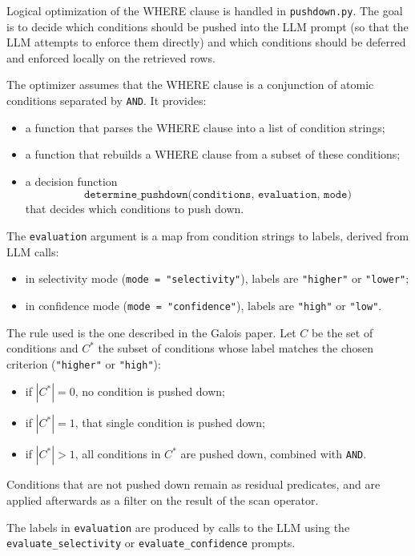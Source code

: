 \documentclass[11pt]{article}
\begin{document}
Logical optimization of the WHERE clause is handled in \texttt{pushdown.py}. The goal is to decide which conditions should be pushed into the LLM prompt (so that the LLM attempts to enforce them directly) and which conditions should be deferred and enforced locally on the retrieved rows.

The optimizer assumes that the WHERE clause is a conjunction of atomic conditions separated by \texttt{AND}. It provides:

\begin{itemize}
  \item a function that parses the WHERE clause into a list of condition strings;
  \item a function that rebuilds a WHERE clause from a subset of these conditions;
  \item a decision function
  \[
    \texttt{determine\_pushdown(conditions, evaluation, mode)}
  \]
  that decides which conditions to push down.
\end{itemize}

The \texttt{evaluation} argument is a map from condition strings to labels, derived from LLM calls:

\begin{itemize}
  \item in selectivity mode (\texttt{mode = "selectivity"}), labels are \texttt{"higher"} or \texttt{"lower"};
  \item in confidence mode (\texttt{mode = "confidence"}), labels are \texttt{"high"} or \texttt{"low"}.
\end{itemize}

The rule used is the one described in the Galois paper. Let $C$ be the set of conditions and $C^\ast$ the subset of conditions whose label matches the chosen criterion (\texttt{"higher"} or \texttt{"high"}):

\begin{itemize}
  \item if $|C^\ast| = 0$, no condition is pushed down;
  \item if $|C^\ast| = 1$, that single condition is pushed down;
  \item if $|C^\ast| > 1$, all conditions in $C^\ast$ are pushed down, combined with \texttt{AND}.
\end{itemize}

Conditions that are not pushed down remain as residual predicates, and are applied afterwards as a filter on the result of the scan operator.

The labels in \texttt{evaluation} are produced by calls to the LLM using the \texttt{evaluate\_selectivity} or \texttt{evaluate\_confidence} prompts.
\end{document}

